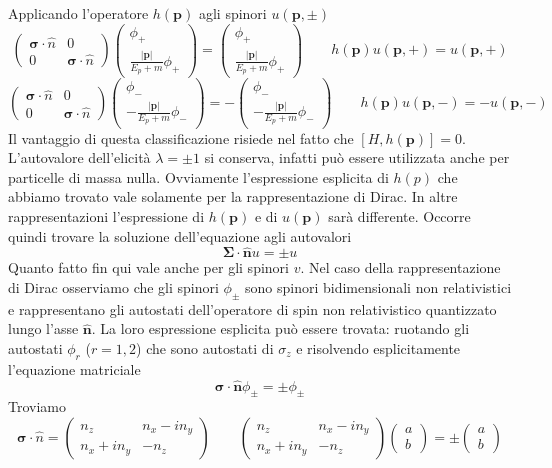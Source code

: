 Applicando l'operatore $h(\mathbf{p})$ agli spinori $u(\mathbf{p}, \pm)$
$$
\begin{pmatrix} \boldsymbol{\sigma} \cdot \hat{n} & 0 \\ 0 & \boldsymbol{\sigma} \cdot \hat{n} \end{pmatrix} \begin{pmatrix} \phi_+ \\ \frac{|\mathbf{p}|}{E_p + m} \phi_+ \end{pmatrix} = \begin{pmatrix} \phi_+ \\ \frac{|\mathbf{p}|}{E_p + m} \phi_+ \end{pmatrix} \qquad h(\mathbf{p})u(\mathbf{p}, +) = u(\mathbf{p}, +)
$$
$$
\begin{pmatrix} \boldsymbol{\sigma} \cdot \hat{n} & 0 \\ 0 & \boldsymbol{\sigma} \cdot \hat{n} \end{pmatrix} \begin{pmatrix} \phi_- \\ -\frac{|\mathbf{p}|}{E_p + m} \phi_- \end{pmatrix} = - \begin{pmatrix} \phi_- \\ -\frac{|\mathbf{p}|}{E_p + m} \phi_- \end{pmatrix} \qquad h(\mathbf{p})u(\mathbf{p}, -) = -u(\mathbf{p}, -)
$$
Il vantaggio di questa classificazione risiede nel fatto che $\left[H,h(\mathbf{p})\right]=0$. L'autovalore dell'elicità $\lambda=\pm 1$ si conserva, infatti può essere utilizzata anche per particelle di massa nulla. Ovviamente l'espressione esplicita di $h(p)$ che abbiamo trovato vale solamente per la rappresentazione di Dirac. In altre rappresentazioni l'espressione di $h(\mathbf{p})$ e di $u(\mathbf{p})$ sarà differente. Occorre quindi trovare la soluzione dell'equazione agli autovalori
$$
\boldsymbol{\Sigma} \cdot \hat{\mathbf{n}} u = \pm u
$$
Quanto fatto fin qui vale anche per gli spinori $v$. Nel caso della rappresentazione di Dirac osserviamo che gli spinori $\phi_\pm$ sono spinori bidimensionali non relativistici e rappresentano gli autostati dell'operatore di spin non relativistico quantizzato lungo l'asse $\hat{\mathbf{n}}$. La loro espressione esplicita può essere trovata: ruotando gli autostati $\phi_r$ ($r=1,2$) che sono autostati di $\sigma_z$ e risolvendo esplicitamente l'equazione matriciale
$$
\boldsymbol{\sigma} \cdot \hat{\mathbf{n}} \phi_\pm = \pm \phi_\pm
$$
Troviamo
$$
\boldsymbol{\sigma} \cdot \hat{n} = \begin{pmatrix} n_z & n_x - in_y \\ n_x + in_y & -n_z \end{pmatrix} \qquad \begin{pmatrix} n_z & n_x - in_y \\ n_x + in_y & -n_z \end{pmatrix} \begin{pmatrix} a \\ b \end{pmatrix} = \pm \begin{pmatrix} a \\ b \end{pmatrix}
$$
